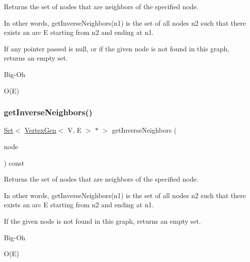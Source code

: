 Returns the set of nodes that are neighbors of the specified node. 

In other words, get\+Inverse\+Neighbors(n1) is the set of all nodes n2 such that there exists an arc E starting from n2 and ending at n1.

If any pointer passed is null, or if the given node is not found in this graph, returns an empty set. \begin{DoxyRefDesc}{Big-\/\+Oh}
\item[\mbox{\hyperlink{BigOh__BigOh000069}{Big-\/\+Oh}}]O(\+E) \end{DoxyRefDesc}
\mbox{\label{classGraph_a5294846b9cdd19394808e3736ec67004}} 
\subsubsection{\texorpdfstring{get\+Inverse\+Neighbors()}{getInverseNeighbors()}\hspace{0.1cm}{\footnotesize\ttfamily [2/2]}}
{\footnotesize\ttfamily \mbox{\hyperlink{classstanfordcpplib_1_1collections_1_1GenericSet}{Set}}$<$ \mbox{\hyperlink{classVertexGen}{Vertex\+Gen}}$<$ V, E $>$  $\ast$ $>$ get\+Inverse\+Neighbors (\begin{DoxyParamCaption}\item[{const std\+::string \&}]{node }\end{DoxyParamCaption}) const\hspace{0.3cm}{\ttfamily [inherited]}}



Returns the set of nodes that are neighbors of the specified node. 

In other words, get\+Inverse\+Neighbors(n1) is the set of all nodes n2 such that there exists an arc E starting from n2 and ending at n1.

If the given node is not found in this graph, returns an empty set. \begin{DoxyRefDesc}{Big-\/\+Oh}
\item[\mbox{\hyperlink{BigOh__BigOh000070}{Big-\/\+Oh}}]O(\+E) \end{DoxyRefDesc}
\mbox{\label{classGraph_ae9b5cbd2bcb3918c4c64b1eb71c1a3a8}} 
